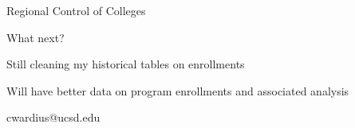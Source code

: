 \documentclass[notes,11pt, aspectratio=169]{beamer}
\newenvironment{wideitemize}{\itemize\addtolength{\itemsep}{10pt}}{\enditemize}
\begin{document}
\begin{frame}{Regional Control of Colleges}
    
\end{frame}


\begin{frame}{What next?}
  \begin{wideitemize}
    \item Still cleaning my historical tables on enrollments
    \item Will have better data on program enrollments and associated analysis 
  \end{wideitemize}
\end{frame}

\begin{frame}{}
\centering cwardius@ucsd.edu
\end{frame}
\end{document}
